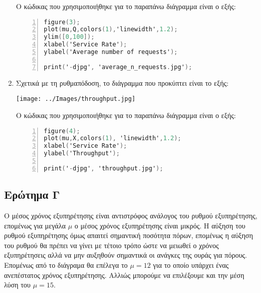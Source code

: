 \documentclass[12pt]{article}
\begin{document}
\begin{enumerate}
        Ο κώδικας που χρησιμοποιήθηκε για το παραπάνω διάγραμμα είναι ο εξής:
            \begin{lstlisting}[language=C,
                               frame=single,
                               numberstyle=\color{codegray},
                               basicstyle=\footnotesize,
                               numbers=left,
                               backgroundcolor=\color{lightgray},
                               numbersep=5pt]
figure(3); 
plot(mu,Q,colors(1),'linewidth',1.2);
ylim([0,100]);
xlabel('Service Rate');
ylabel('Average number of requests');

print('-djpg', 'average_n_requests.jpg');
            \end{lstlisting}

    \pagebreak
    \item{}
        Σχετικά με τη ρυθμαπόδοση, το διάγραμμα που προκύπτει είναι το εξής:
        \begin{center}
            \texttt{[image: ../Images/throughput.jpg]}
        \end{center}

        Ο κώδικας που χρησιμοποιήθηκε για το παραπάνω διάγραμμα είναι ο εξής:
            \begin{lstlisting}[language=C,
                               frame=single,
                               numberstyle=\color{codegray},
                               basicstyle=\footnotesize,
                               numbers=left,
                               backgroundcolor=\color{lightgray},
                               numbersep=5pt]
figure(4);
plot(mu,X,colors(1), 'linewidth',1.2);
xlabel('Service Rate');
ylabel('Throughput');

print('-djpg', 'throughput.jpg');
            \end{lstlisting}


\end{enumerate}

\subsection{Ερώτημα Γ}
Ο μέσος χρόνος εξυπηρέτησης είναι αντιστρόφος ανάλογος του ρυθμού εξυπηρέτησης, 
επομένως για μεγάλα $\mu$ ο μέσος χρόνος εξυπηρέτησης είναι μικρός. Η αύξηση 
του ρυθμού εξυπηρέτησης όμως απαιτεί σημαντική ποσότητα πόρων, επομένως η αύξηση 
του ρυθμού θα πρέπει να γίνει με τέτοιο τρόπο ώστε να μειωθεί ο χρόνος εξυπηρέτησεις 
αλλά να μην αυξηθούν σημαντικά οι ανάγκες της ουράς για πόρους. Επομένως από το 
διάγραμα θα επέλεγα το $\mu = 12$ για το οποίο υπάρχει ένας ανεπέστατος χρόνος 
εξυπηρέτησης. Αλλιώς μπορούμε να επιλέξουμε και την μέση λύση του $\mu = 15$.
\end{document}
